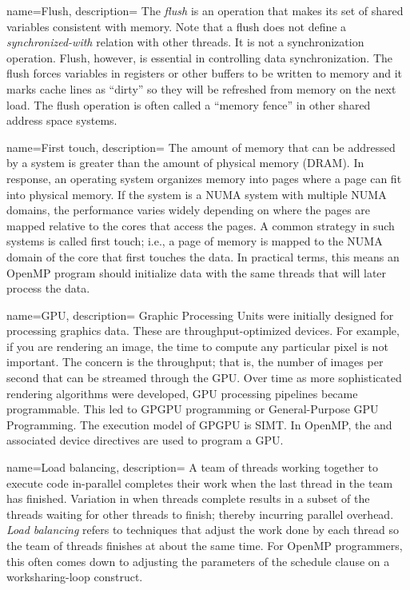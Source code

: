 {
   name={Flush},
   description={
   The \emph{flush} is an operation that makes its set of shared variables consistent with memory. 
   Note that a flush does not define a \emph{synchronized-with} relation with other threads.  It is not
   a synchronization operation.  Flush, however, is essential in controlling data synchronization.  The
   flush forces variables in registers or other buffers to be written to memory and it marks cache lines as ``dirty'' so they will
   be refreshed from memory on the next load.  The flush operation is often called a ``memory fence'' in other shared address 
   space systems.  
   }
}   


{
   name={First touch},
   description={
   The amount of memory that can be addressed by a system is greater than the amount of physical 
   memory (DRAM).   In response, an operating system organizes memory into pages where a page
   can fit into physical memory.  If the system is a NUMA system with multiple NUMA domains, the performance
   varies widely depending on where the pages are mapped relative to the cores that access the pages.  A 
   common strategy in such systems is called first touch; i.e., a page of memory is mapped to the NUMA domain
   of the core that first touches the data.  In practical terms, this means an OpenMP program should initialize data 
   with the same threads that will later process the data. 
   }
}   



{
   name={GPU},
   description={
   Graphic Processing Units were initially designed for processing graphics data.  These are
   throughput-optimized devices.  For example, if you are rendering an image, the time to 
   compute any particular pixel is not important.  The concern is the throughput; that is,
   the number of images per second that can be streamed through the GPU.  Over time as 
   more sophisticated rendering algorithms were developed, GPU processing pipelines
   became programmable.   This led to GPGPU programming or General-Purpose GPU Programming.   
   The execution model of GPGPU is SIMT.  In OpenMP, the  and associated device
   directives are used to program a GPU.
  }
}   


{
   name={Load balancing},
   description={
   A team of threads working together to execute code in-parallel completes their work
   when the last thread in the team has finished.  Variation in when threads complete
   results in a subset of the threads waiting for other threads to finish; thereby incurring
   parallel overhead.  \emph{Load balancing} refers to techniques that adjust
   the work done by each thread so the team of threads finishes at about the same time.  For 
   OpenMP programmers, this often comes down to adjusting the parameters of the schedule clause
   on a worksharing-loop construct.  
   }
}   


